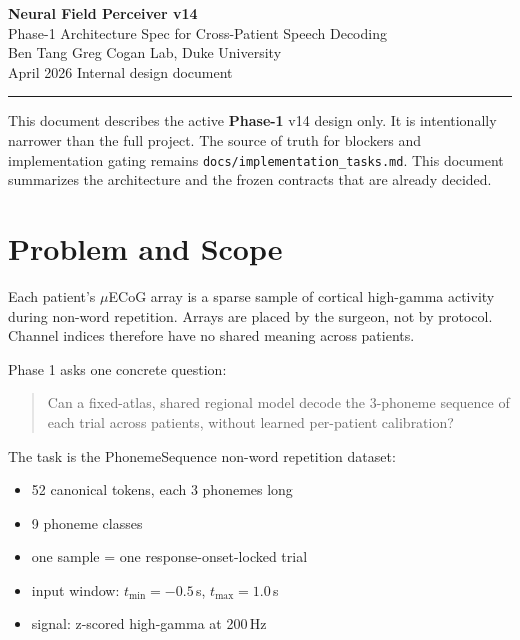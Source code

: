 \documentclass[11pt,letterpaper]{article}
\begin{document}
\begin{center}
{\LARGE\bfseries Neural Field Perceiver v14}\\[6pt]
{\large Phase-1 Architecture Spec for Cross-Patient Speech Decoding}\\[10pt]
{\normalsize Ben Tang \quad\textbar\quad Greg Cogan Lab, Duke University}\\[4pt]
{\normalsize April 2026 \quad\textbar\quad Internal design document}
\end{center}

\medskip\noindent\rule{\textwidth}{0.4pt}\medskip

\noindent
This document describes the active \textbf{Phase-1} v14 design only. It is intentionally narrower than the full project. The source of truth for blockers and implementation gating remains \texttt{docs/implementation\_tasks.md}. This document summarizes the architecture and the frozen contracts that are already decided.


\section{Problem and Scope}

Each patient's $\mu$ECoG array is a sparse sample of cortical high-gamma activity during non-word repetition. Arrays are placed by the surgeon, not by protocol. Channel indices therefore have no shared meaning across patients.

Phase 1 asks one concrete question:
\begin{quote}
Can a fixed-atlas, shared regional model decode the 3-phoneme sequence of each trial across patients, without learned per-patient calibration?
\end{quote}

The task is the PhonemeSequence non-word repetition dataset:
\begin{itemize}[leftmargin=2em, itemsep=0.2em]
\item 52 canonical tokens, each 3 phonemes long
\item 9 phoneme classes
\item one sample = one response-onset-locked trial
\item input window: $t_{\min}=-0.5$\,s, $t_{\max}=1.0$\,s
\item signal: z-scored high-gamma at 200\,Hz
\end{itemize}
\end{document}

